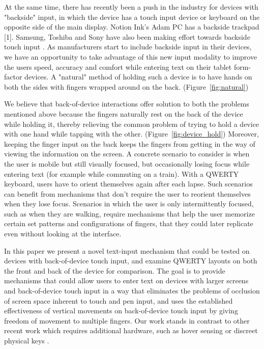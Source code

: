 At the same time, there has recently been a push in the industry for devices with "backside" input, in which the device has a touch input device or keyboard on the opposite side of the main display. Notion Ink's Adam PC has a backside trackpad [1]. Samsung, Toshiba and Sony have also been making effort towards backside touch input . As manufacturers start to include backside input in their devices, we have an opportunity to take advantage of this new input modality to improve the users speed, accuracy and comfort while entering text on their tablet form-factor devices. A "natural" method of holding such a device is to have hands on both the sides with fingers wrapped around on the back. \cite{Vogel} (Figure~\ref{fig:natural})

We believe that back-of-device interactions offer solution to both the problems mentioned above because the fingers naturally rest on the back of the device while holding it, thereby relieving the common problem of trying to hold a device with one hand while tapping with the other. (Figure~\ref{fig:device_hold}) Moreover, keeping the finger input on the back keeps the fingers from getting in the way of viewing the information on the screen. A concrete scenario to consider is when the user is mobile but still visually focused, but occasionally losing focus while entering text (for example while commuting on a train).  With a QWERTY keyboard, users have to orient themselves again after each lapse. Such scenarios can benefit from mechanisms that don't require the user to reorient themselves when they lose focus.  Scenarios in which the user is only intermittently focused, such as when they are walking, require mechanisms that help the user memorize certain set patterns and configurations of fingers, that they could later replicate even without looking at the interface. 

In this paper we present a novel text-input mechanism that could be tested on devices with back-of-device touch input, and examine QWERTY layouts on both the front and back of the device for comparison. The goal is to provide mechanisms that could allow users to enter text on
devices with larger screens and back-of-device touch input in a way that eliminates the problems of occlusion of screen space inherent to touch and pen input, and uses the established effectiveness of
vertical movements on back-of-device touch input \cite{Wobbrock} by giving freedom of movement to multiple fingers.  Our work stands in contrast to other recent work which requires additional hardware, such as hover sensing \cite{LucidTouch} or discreet physical keys \cite{RearType}.

